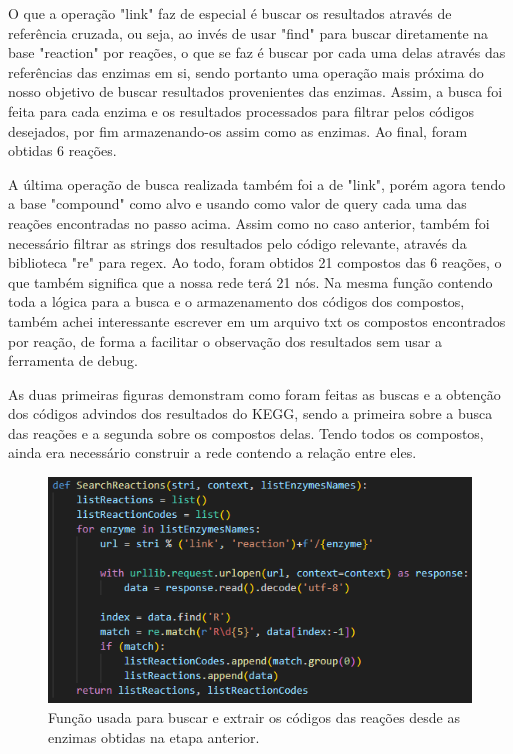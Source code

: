 \documentclass[brazilian,12pt,a4paper,final]{article}
\begin{document}
	O que a operação "link" faz de especial é buscar os resultados através de referência cruzada, ou seja, ao invés de usar "find" para buscar diretamente na base "reaction" por reações, o que se faz é buscar por cada uma delas através das referências das enzimas em si, sendo portanto uma operação mais próxima do nosso objetivo de buscar resultados provenientes das enzimas. Assim, a busca foi feita para cada enzima e os resultados processados para filtrar pelos códigos desejados, por fim armazenando-os assim como as enzimas. Ao final, foram obtidas 6 reações.
	\vspace{0.5cm}
	
	A última operação de busca realizada também foi a de "link", porém agora tendo a base "compound" como alvo e usando como valor de query cada uma das reações encontradas no passo acima. Assim como no caso anterior, também foi necessário filtrar as strings dos resultados pelo código relevante, através da biblioteca "re" para regex. Ao todo, foram obtidos 21 compostos das 6 reações, o que também significa que a nossa rede terá 21 nós. Na mesma função contendo toda a lógica para a busca e o armazenamento dos códigos dos compostos, também achei interessante escrever em um arquivo txt os compostos encontrados por reação, de forma a facilitar o observação dos resultados sem usar a ferramenta de debug.
	\vspace{0.5cm}
	
	As duas primeiras figuras demonstram como foram feitas as buscas e a obtenção dos códigos advindos dos resultados do KEGG, sendo a primeira sobre a busca das reações e a segunda sobre os compostos delas. Tendo todos os compostos, ainda era necessário construir a rede contendo a relação entre eles.
	
		
	\begin{figure}[hbtp]
		\begin{center}
			\includegraphics[]{SearchReactions.png}
			\caption{Função usada para buscar e extrair os códigos das reações desde as enzimas obtidas na etapa anterior.}
			\label{fig}
		\end{center}
	\end{figure}
	
\end{document}
